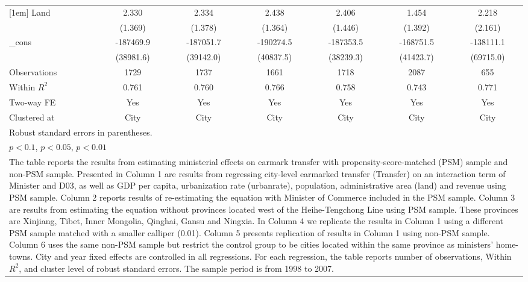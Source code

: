 \documentclass[11pt,a4paper]{article}
\begin{document}
\begin{center}
\begin{scriptsize}
{\begin{tabular}{l*{6}{c}}
[1em]
Land        &       2.330\sym{*}  &       2.334\sym{*}  &       2.438\sym{*}  &        2.406\sym{*}    &         1.454         &       2.218    \\
            &     (1.369)         &     (1.378)         &     (1.364)         &     (1.446)         &       (1.392)         &     (2.161)            \\
[1em]
\_cons      &   -187469.9\sym{***}&   -187051.7\sym{***}&   -190274.5\sym{***}&  -187353.5\sym{***} &  -168751.5\sym{***}&   -138111.1\sym{*} \\
            &   (38981.6)         &   (39142.0)         &   (40837.5)         & (38239.3)    &   (41423.7)         &   (69715.0)         \\
\hline
Observations        &        1729         &        1737         &        1661         &       1718         &         2087         &         655          \\
Within $R^{2}$       &       0.761         &       0.760         &       0.766         &       0.758          &      0.743         &       0.771         \\
Two-way FE    &   Yes    &      Yes     &   Yes         &      Yes            &     Yes           &           Yes            \\
Clustered at      &        City         &        City         &        City         &        City         &        City         &        City         \\
\hline\hline
\multicolumn{7}{l}{\footnotesize Robust standard errors in parentheses.}\\
\multicolumn{7}{l}{\footnotesize \sym{*} \(p<0.1\), \sym{**} \(p<0.05\), \sym{***} \(p<0.01\)}\\
\multicolumn{7}{p{14.5cm}}{\footnotesize The table reports the results from estimating ministerial effects on earmark transfer with propensity-score-matched (PSM) sample and non-PSM sample. Presented in Column 1 are results from regressing city-level earmarked transfer (Transfer) on an interaction term of Minister and D03, as well as GDP per capita, urbanization rate (urbanrate), population, administrative area (land) and revenue using PSM sample. Column 2 reports results of re-estimating the equation with Minister of Commerce included in the PSM sample. Column 3 are results from estimating the equation without provinces located west of the Heihe-Tengchong Line using PSM sample. These provinces are Xinjiang, Tibet, Inner Mongolia, Qinghai, Gansu and Ningxia. In Column 4 we replicate the results in Column 1 using a different PSM sample matched with a smaller calliper (0.01). Column 5 presents replication of results in Column 1 using non-PSM sample. Column 6 uses the same non-PSM sample but restrict the control group to be cities located within the same province as ministers' home-towns. City and year fixed effects are controlled in all regressions. For each regression, the table reports number of observations, Within $R^{2}$, and cluster level of robust standard errors. The sample period is from 1998 to 2007. }\\
\end{tabular}
}


\end{scriptsize}
\end{center}
\end{document}
